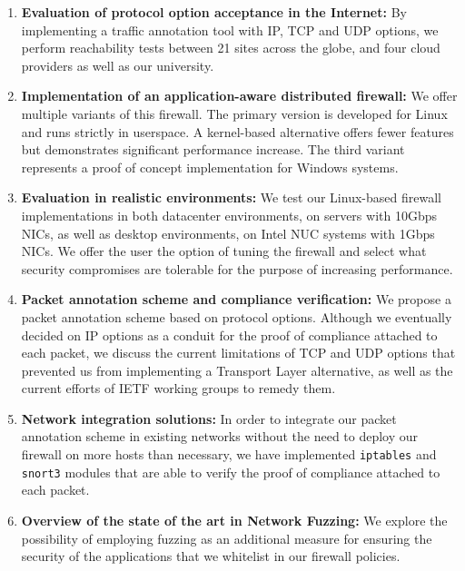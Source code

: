 \begin{enumerate}
    \item \textbf{Evaluation of protocol option acceptance in the Internet:}
          By implementing a traffic annotation tool with IP, TCP and UDP options,
          we perform reachability tests between 21 sites across the globe, and
          four cloud providers as well as our university.
    \item \textbf{Implementation of an application-aware distributed firewall:}
          We offer multiple variants of this firewall. The primary version is
          developed for Linux and runs strictly in userspace. A kernel-based
          alternative offers fewer features but demonstrates significant
          performance increase. The third variant represents a proof of concept
          implementation for Windows systems.
    \item \textbf{Evaluation in realistic environments:} We test our Linux-based
          firewall implementations in both datacenter environments, on servers
          with 10Gbps NICs, as well as desktop environments, on Intel NUC
          systems with 1Gbps NICs. We offer the user the option of tuning the
          firewall and select what security compromises are tolerable for the
          purpose of increasing performance.
    \item \textbf{Packet annotation scheme and compliance verification:} We
          propose a packet annotation scheme based on protocol options. Although
          we eventually decided on IP options as a conduit for the proof of
          compliance attached to each packet, we discuss the current limitations
          of TCP and UDP options that prevented us from implementing a Transport
          Layer alternative, as well as the current efforts of IETF working
          groups to remedy them.
    \item \textbf{Network integration solutions:} In order to integrate our
          packet annotation scheme in existing networks without the need to
          deploy our firewall on more hosts than necessary, we have implemented
          \texttt{iptables} and \texttt{snort3} modules that are able to
          verify the proof of compliance attached to each packet.
    \item \textbf{Overview of the state of the art in Network Fuzzing:}
          We explore the possibility of employing fuzzing as an additional
          measure for ensuring the security of the applications that we
          whitelist in our firewall policies.
\end{enumerate}

